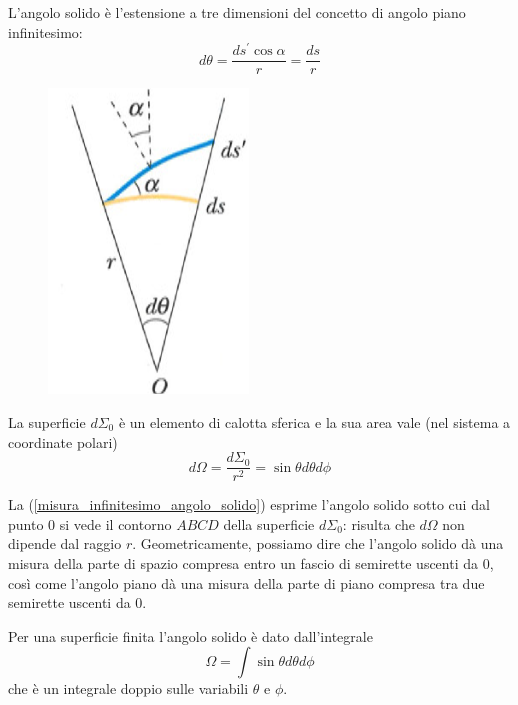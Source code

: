 \documentclass[class=book, crop=false, oneside, 12pt]{standalone}
\begin{document}
L'angolo solido è l'estensione a tre dimensioni del concetto di angolo piano infinitesimo:
\begin{equation}
    d \theta = \frac{ds^{\prime} \cos \alpha}{r} = \frac{ds}{r}
\end{equation}
\begin{figure}[h]
    \includegraphics[scale=0.5]{angolo_piano.png}
    \centering
    \caption{}
\end{figure}
La superficie \(d \Sigma_0\) è un elemento di calotta sferica e la sua area vale (nel sistema a coordinate polari)
\begin{equation} \label{misura_infinitesimo_angolo_solido}
    d \Omega = \frac{d \Sigma_0}{r^2} = \sin \theta d \theta d \phi
\end{equation}

La (\ref{misura_infinitesimo_angolo_solido}) esprime l'angolo solido sotto cui dal punto \(0\) si vede il contorno \(ABCD\) della superficie \(d \Sigma_0\): 
risulta che \(d \Omega\) non dipende dal raggio \(r\). 
Geometricamente, possiamo dire che l'angolo solido dà una misura della parte di spazio compresa entro un fascio di semirette uscenti da \(0\), così come l'angolo piano dà una misura della parte di piano compresa tra due semirette uscenti da \(0\).

Per una superficie finita l'angolo solido è dato dall'integrale
\begin{equation}
    \Omega = \int \sin \theta d \theta d \phi
\end{equation}
che è un integrale doppio sulle variabili \(\theta\) e \(\phi\).
\end{document}

